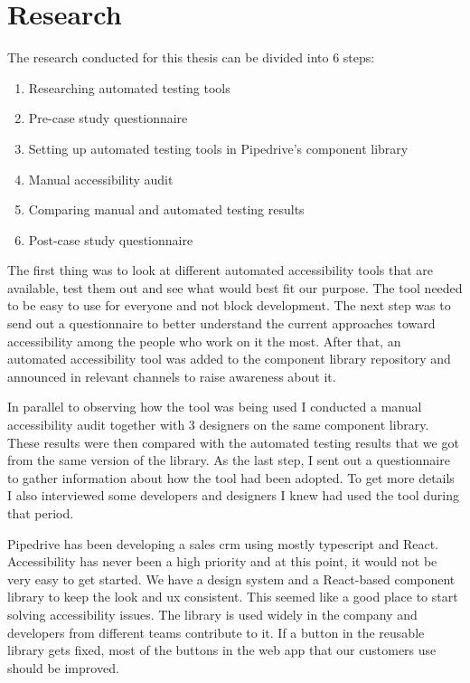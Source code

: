 \documentclass{master_thesis}
\begin{document}
\section{Research}

The research conducted for this thesis can be divided into 6 steps:

\begin{enumerate}
	\item Researching automated testing tools
	\item Pre-case study questionnaire
	\item Setting up automated testing tools in Pipedrive's component library
	\item Manual accessibility audit
	\item Comparing manual and automated testing results
	\item Post-case study questionnaire
\end{enumerate}

The first thing was to look at different automated accessibility tools that are available, test them out and see what would best fit our purpose. The tool needed to be easy to use for everyone and not block development. The next step was to send out a questionnaire to better understand the current approaches toward accessibility among the people who work on it the most. After that, an automated accessibility tool was added to the component library repository and announced in relevant channels to raise awareness about it.

In parallel to observing how the tool was being used I conducted a manual accessibility audit together with 3 designers on the same component library. These results were then compared with the automated testing results that we got from the same version of the library. As the last step, I sent out a questionnaire to gather information about how the tool had been adopted. To get more details I also interviewed some developers and designers I knew had used the tool during that period.

Pipedrive has been developing a sales \ac{crm} using mostly typescript and React. Accessibility has never been a high priority and at this point, it would not be very easy to get started. We have a design system and a React-based component library to keep the look and \ac{ux} consistent. This seemed like a good place to start solving accessibility issues. The library is used widely in the company and developers from different teams contribute to it. If a button in the reusable library gets fixed, most of the buttons in the web app that our customers use should be improved.
\end{document}
